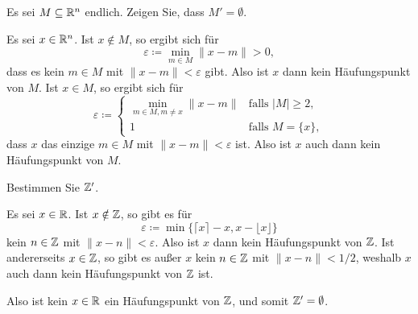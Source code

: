 \documentclass[a4paper,10pt]{article}
\begin{document}
\begin{question}
 Es sei $M \subseteq \mathbb{R}^n$ endlich. Zeigen Sie, dass $M' = \emptyset$.
\end{question}
\begin{solution}
 Es sei $x \in \mathbb{R}^n$. Ist $x \notin M$, so ergibt sich für
 \[
  \varepsilon \coloneqq \min_{m \in M} \|x-m\| > 0,
 \]
 dass es kein $m \in M$ mit $\|x-m\| < \varepsilon$ gibt. Also ist $x$ dann kein Häufungspunkt von $M$. Ist $x \in M$, so ergibt sich für
 \[
  \varepsilon
  \coloneqq
  \begin{cases}
   \min_{m \in M, m \neq x} \|x-m\| & \text{falls $|M| \geq 2$}, \\
                                  1 & \text{falls $M = \{x\}$},
  \end{cases}
 \]
 dass $x$ das einzige $m \in M$ mit $\|x-m\| < \varepsilon$ ist. Also ist $x$ auch dann kein Häufungspunkt von $M$.
\end{solution}


\begin{question}
 Bestimmen Sie $\mathbb{Z}'$.
\end{question}
\begin{solution}
 Es sei $x \in \mathbb{R}$. Ist $x \notin \mathbb{Z}$, so gibt es für
 \[
  \varepsilon \coloneqq \min\{ \lceil x \rceil - x, x - \lfloor x \rfloor \}
 \]
 kein $n \in \mathbb{Z}$ mit $\|x-n\| < \varepsilon$. Also ist $x$ dann kein Häufungspunkt von $\mathbb{Z}$. Ist andererseits $x \in \mathbb{Z}$, so gibt es außer $x$ kein $n \in \mathbb{Z}$ mit $\|x-n\| < 1/2$, weshalb $x$ auch dann kein Häufungspunkt von $\mathbb{Z}$ ist.
 
 Also ist kein $x \in \mathbb{R}$ ein Häufungspunkt von $\mathbb{Z}$, und somit $\mathbb{Z}' = \emptyset$.
\end{solution}
\end{document}
